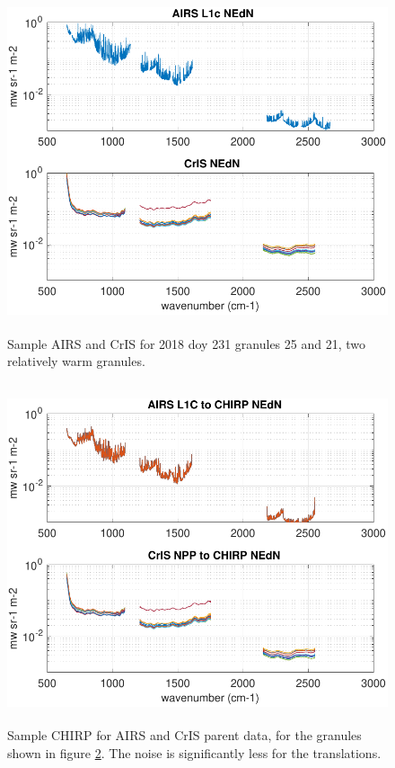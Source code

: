 \documentclass[12pt]{article}
\begin{document}
\begin{figure}
  \centering
  \includegraphics[height=10cm]{figures/sample_airs_and_cris_nedn.pdf}
  \caption{Sample AIRS and CrIS {\nedn} for 2018 doy 231 granules 25
    and 21, two relatively warm granules.}
  \label{fig12}
\end{figure}

\begin{figure}
  \centering
  \includegraphics[height=10cm]{figures/chirp_nedn_from_airs_and_cris.pdf}
  \caption{Sample CHIRP {\nedn} for AIRS and CrIS parent data, for
    the granules shown in figure \ref{fig12}.  The noise is
    significantly less for the translations.}
  \label{fig12}
\end{figure}
\end{document}
